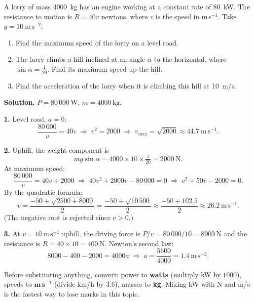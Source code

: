 \documentclass[11pt]{article}
\begin{document}
\begin{exoresolu}
A lorry of mass \SI{4000}{kg} has an engine working at a constant rate of \SI{80}{kW}. The resistance to motion is $R = 40v$ newtons, where $v$ is the speed in $\mathrm{m\,s^{-1}}$. Take $g = 10\ \mathrm{m\,s^{-2}}$.
\begin{enumerate}
\item Find the maximum speed of the lorry on a level road.
\item The lorry climbs a hill inclined at an angle $\alpha$ to the horizontal, where $\sin\alpha = \tfrac{1}{20}$. Find its maximum speed up the hill.
\item Find the acceleration of the lorry when it is climbing this hill at \SI{10}{m/s}.
\end{enumerate}
\tcblower
\textbf{Solution.} $P = 80\,000\ \mathrm{W}$, $m = 4000\ \mathrm{kg}$.

\textbf{1.} Level road, $a = 0$:
\[
\frac{80\,000}{v} = 40v \;\Longrightarrow\; v^2 = 2000 \;\Longrightarrow\; v_{\max} = \sqrt{2000} \approx 44.7\ \mathrm{m\,s^{-1}}.
\]

\textbf{2.} Uphill, the weight component is
\[
mg\sin\alpha = 4000 \times 10 \times \tfrac{1}{20} = 2000\ \mathrm{N}.
\]
At maximum speed:
\[
\frac{80\,000}{v} = 40v + 2000
\;\Longrightarrow\;
40v^2 + 2000v - 80\,000 = 0
\;\Longrightarrow\;
v^2 + 50v - 2000 = 0.
\]
By the quadratic formula:
\[
v = \frac{-50 + \sqrt{2500 + 8000}}{2} = \frac{-50 + \sqrt{10\,500}}{2} \approx \frac{-50 + 102.5}{2} \approx 26.2\ \mathrm{m\,s^{-1}}.
\]
(The negative root is rejected since $v > 0$.)

\textbf{3.} At $v = 10\ \mathrm{m\,s^{-1}}$ uphill, the driving force is $P/v = 80\,000/10 = 8000\ \mathrm{N}$ and the resistance is $R = 40 \times 10 = 400\ \mathrm{N}$. Newton's second law:
\[
8000 - 400 - 2000 = 4000a
\;\Longrightarrow\;
a = \frac{5600}{4000} = 1.4\ \mathrm{m\,s^{-2}}.
\]
\end{exoresolu}

\begin{attention}
Before substituting anything, convert: power to \textbf{watts} (multiply kW by $1000$), speeds to $\mathbf{m\,s^{-1}}$ (divide km/h by $3.6$), masses to \textbf{kg}. Mixing kW with N and m/s is the fastest way to lose marks in this topic.
\end{attention}
\end{document}
